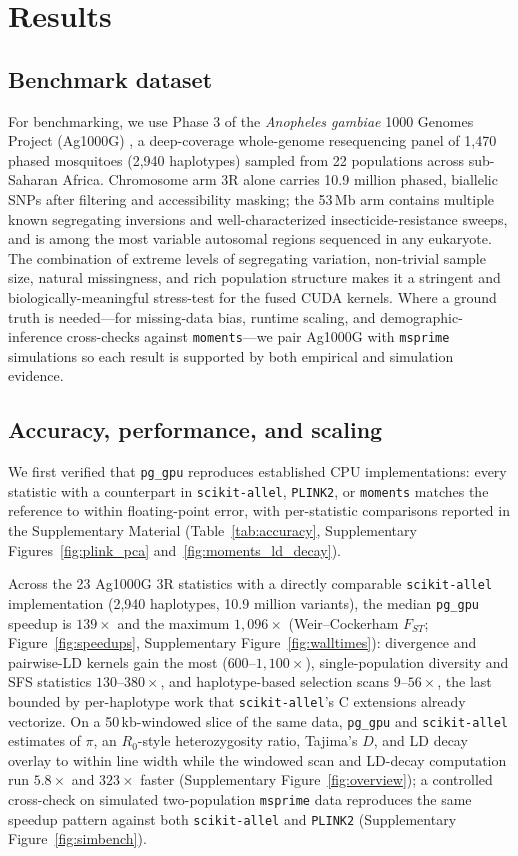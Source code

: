 \documentclass[12pt]{article}
\newcommand{\citep}{\parencite}
\newcommand{\pggpu}{\texttt{pg\_gpu}\xspace}
\newcommand{\scikitallel}{\texttt{scikit-allel}\xspace}
\newcommand{\plinktwo}{\texttt{PLINK2}\xspace}
\newcommand{\moments}{\texttt{moments}\xspace}
\newcommand{\msprime}{\texttt{msprime}\xspace}
\begin{document}
\section*{Results}

\subsection*{Benchmark dataset}

For benchmarking, we use Phase 3 of the \emph{Anopheles
gambiae} 1000 Genomes Project (Ag1000G) \citep{ag1000g2017}, a
deep-coverage whole-genome resequencing panel of 1{,}470 phased
mosquitoes (2{,}940 haplotypes) sampled from 22 populations across
sub-Saharan Africa. Chromosome arm 3R alone carries 10.9 million
phased, biallelic SNPs after filtering and accessibility masking; the
53\,Mb arm contains multiple known segregating inversions and
well-characterized insecticide-resistance sweeps, and is among the
most variable autosomal regions sequenced in any eukaryote. The
combination of extreme levels of segregating variation, non-trivial sample size, 
natural missingness, and rich population structure makes it a stringent and
biologically-meaningful stress-test for the fused CUDA kernels. Where a ground truth is
needed---for missing-data bias, runtime scaling, and
demographic-inference cross-checks against \moments---we pair
Ag1000G with \msprime \citep{baumdicker2022} simulations so each
result is supported by both empirical and simulation evidence.

\subsection*{Accuracy, performance, and scaling}

We first verified that \pggpu reproduces established CPU
implementations: every statistic with a counterpart in \scikitallel,
\plinktwo, or \moments matches the reference to within floating-point
error, with per-statistic comparisons reported in the Supplementary
Material (Table~\ref{tab:accuracy}, Supplementary
Figures~\ref{fig:plink_pca} and~\ref{fig:moments_ld_decay}).

Across the 23 Ag1000G 3R statistics with a directly comparable
\scikitallel implementation (2{,}940 haplotypes, 10.9 million
variants), the median \pggpu speedup is $139\times$ and the maximum
$1{,}096\times$ (Weir--Cockerham $F_{ST}$; Figure~\ref{fig:speedups},
Supplementary Figure~\ref{fig:walltimes}): divergence and pairwise-LD
kernels gain the most ($600$--$1{,}100\times$), single-population
diversity and SFS statistics $130$--$380\times$, and haplotype-based
selection scans $9$--$56\times$, the last bounded by per-haplotype
work that \scikitallel's C extensions already vectorize. On a
50\,kb-windowed slice of the same data, \pggpu and \scikitallel
estimates of $\pi$, an $R_0$-style heterozygosity ratio, Tajima's $D$,
and LD decay overlay to within line width while the windowed scan and
LD-decay computation run $5.8\times$ and $323\times$ faster
(Supplementary Figure~\ref{fig:overview}); a controlled cross-check on simulated
two-population \msprime data reproduces the same speedup pattern
against both \scikitallel and \plinktwo
(Supplementary Figure~\ref{fig:simbench}).
\end{document}
